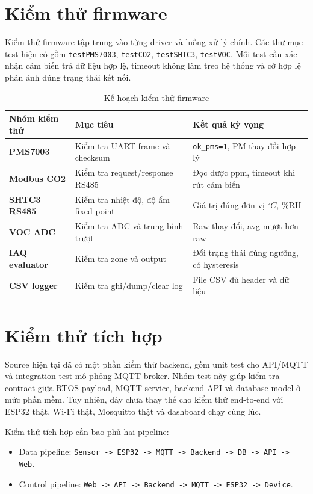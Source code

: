 \section{Kiểm thử firmware}

Kiểm thử firmware tập trung vào từng driver và luồng xử lý chính. Các thư mục test hiện có gồm \texttt{testPMS7003}, \texttt{testCO2}, \texttt{testSHTC3}, \texttt{testVOC}. Mỗi test cần xác nhận cảm biến trả dữ liệu hợp lệ, timeout không làm treo hệ thống và cờ hợp lệ phản ánh đúng trạng thái kết nối.

\begin{table}[H]
    \centering
    \caption{Kế hoạch kiểm thử firmware}
    \begin{tabularx}{\textwidth}{>{\bfseries}l X X}
        \toprule
        Nhóm kiểm thử & Mục tiêu & Kết quả kỳ vọng \\
        \midrule
        PMS7003 & Kiểm tra UART frame và checksum & \texttt{ok\_pms=1}, PM thay đổi hợp lý \\
        Modbus CO2 & Kiểm tra request/response RS485 & Đọc được ppm, timeout khi rút cảm biến \\
        SHTC3 RS485 & Kiểm tra nhiệt độ, độ ẩm fixed-point & Giá trị đúng đơn vị \(^{\circ}C\), \%RH \\
        VOC ADC & Kiểm tra ADC và trung bình trượt & Raw thay đổi, avg mượt hơn raw \\
        IAQ evaluator & Kiểm tra zone và output & Đổi trạng thái đúng ngưỡng, có hysteresis \\
        CSV logger & Kiểm tra ghi/dump/clear log & File CSV đủ header và dữ liệu \\
        \bottomrule
    \end{tabularx}
\end{table}

\section{Kiểm thử tích hợp}

Source hiện tại đã có một phần kiểm thử backend, gồm unit test cho API/MQTT và integration test mô phỏng MQTT broker. Nhóm test này giúp kiểm tra contract giữa RTOS payload, MQTT service, backend API và database model ở mức phần mềm. Tuy nhiên, đây chưa thay thế cho kiểm thử end-to-end với ESP32 thật, Wi-Fi thật, Mosquitto thật và dashboard chạy cùng lúc.

Kiểm thử tích hợp cần bao phủ hai pipeline:

\begin{itemize}[leftmargin=2em]
    \item Data pipeline: \texttt{Sensor -> ESP32 -> MQTT -> Backend -> DB -> API -> Web}.
    \item Control pipeline: \texttt{Web -> API -> Backend -> MQTT -> ESP32 -> Device}.
\end{itemize}

